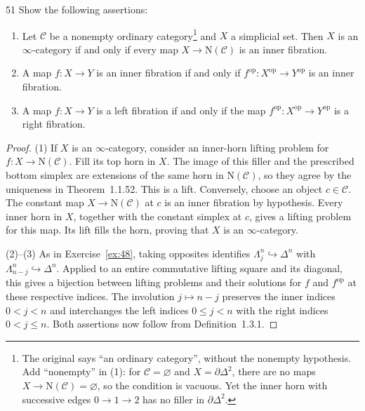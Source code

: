 \begin{exercise}{51}
Show the following assertions:
\begin{enumerate}[label=(\arabic*)]
\item Let $\mathcal C$ be a nonempty ordinary category\footnote{The original says ``an ordinary category'', without the nonempty hypothesis. Add ``nonempty'' in (1): for $\mathcal C=\varnothing$ and $X=\partial\Delta^2$, there are no maps $X\to\mathrm{N}(\mathcal C)=\varnothing$, so the condition is vacuous. Yet the inner horn with successive edges $0\to1\to2$ has no filler in $\partial\Delta^2$.} and $X$ a simplicial set. Then $X$ is an $\infty$-category if and
only if every map $X\to\mathrm{N}(\mathcal C)$ is an inner fibration.
\item A map $f\colon X\to Y$ is an inner fibration if and only if $f^{\mathrm{op}}\colon X^{\mathrm{op}}\to Y^{\mathrm{op}}$ is an inner
fibration.
\item A map $f\colon X\to Y$ is a left fibration if and only if the map $f^{\mathrm{op}}\colon X^{\mathrm{op}}\to Y^{\mathrm{op}}$ is a right
fibration.
\end{enumerate}

\begin{proof}
(1) If $X$ is an $\infty$-category, consider an inner-horn
lifting problem for $f\colon X\to\mathrm{N}(\mathcal C)$.
Fill its top horn in $X$. The image of this filler and the
prescribed bottom simplex are extensions of the same horn in
$\mathrm{N}(\mathcal C)$, so they agree by the uniqueness
in Theorem~1.1.52. This is a lift.
Conversely, choose an object $c\in\mathcal C$.
The constant map $X\to\mathrm{N}(\mathcal C)$ at $c$ is
an inner fibration by hypothesis.
Every inner horn in $X$, together with the constant simplex
at $c$, gives a lifting problem for this map.
Its lift fills the horn, proving that $X$ is an $\infty$-category.

(2)--(3) As in Exercise~\ref{ex:48}, taking opposites
identifies $\Lambda^n_j\hookrightarrow\Delta^n$ with
$\Lambda^n_{n-j}\hookrightarrow\Delta^n$.
Applied to an entire commutative lifting square and its diagonal,
this gives a bijection between lifting problems and their
solutions for $f$ and $f^{\mathrm{op}}$ at these respective indices.
The involution $j\mapsto n-j$ preserves the inner indices
$0<j<n$ and interchanges the left indices $0\le j<n$
with the right indices $0<j\le n$.
Both assertions now follow from Definition~1.3.1.
\end{proof}
\end{exercise}
